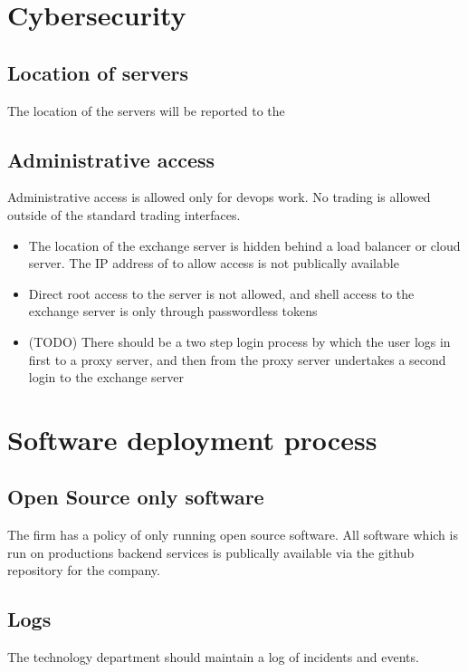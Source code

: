 \section{Cybersecurity}

\subsection{Location of servers}
The location of the servers will be reported to the 

\subsection{Administrative access}
Administrative access is allowed only for devops work.  No trading is
allowed outside of the standard trading interfaces.

\begin{itemize}
\item The location of the exchange server is hidden behind a load
  balancer or cloud server.  The IP address of to allow access is not
  publically available
\item Direct root access to the server is not allowed, and shell access to
  the exchange server is only through passwordless tokens
\item (TODO) There should be a two step login process by which the
  user logs in first to a proxy server, and then from the proxy server
  undertakes a second login to the exchange server
\end{itemize}

\section{Software deployment process}
\subsection{Open Source only software}

The firm has a policy of only running open source software.  All
software which is run on productions backend services is publically
available via the github repository for the company.

\subsection{Logs}
The technology department should maintain a log of incidents and
events.  

